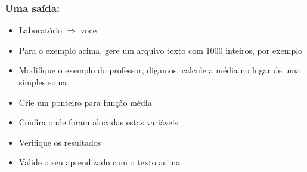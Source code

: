 \begin{frame}[fragile, c]

\frametitle{Uma saída:}
\begin{block}{}
\begin{itemize}
  \item Laboratório $\Rightarrow $ voce
  \item Para o exemplo acima, gere um arquivo texto com 1000 inteiros, por exemplo
  \item Modifique o exemplo do professor, digamos, calcule
  a média no lugar de uma simples soma
  \item Crie um ponteiro para  função média 
    \item Confira onde foram alocadas estas variáveis
  \item Verifique os resultados
  \item Valide o seu aprendizado com o texto acima 

\end{itemize}
\end{block}
\end{frame}
